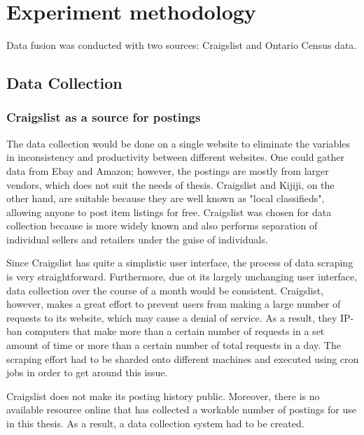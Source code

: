 \documentclass[12pt]{article}
\begin{document}


\section{Experiment methodology}

Data fusion was conducted with two sources: Craigslist and Ontario Census data. 

\subsection{Data Collection}
\subsubsection{Craigslist as a source for postings}
The data collection would be done on a single website to eliminate the variables in inconsistency and productivity between different websites. One could gather data from Ebay and Amazon; however, the postings are mostly from larger vendors, which does not suit the needs of thesis. Craigslist and Kijiji, on the other hand, are suitable because they are well known as "local classifieds", allowing anyone to post item listings for free. Craigslist was chosen for data collection because is more widely known and also performs separation of individual sellers and retailers under the guise of individuals. 

Since Craigslist has quite a simplistic user interface, the process of data scraping is very straightforward. Furthermore, due ot its largely unchanging user interface, data collection over the course of a month would be consistent. Craigslist, however, makes a great effort to prevent users from making a large number of requests to its website, which may cause a denial of service. As a result, they IP-ban computers that make more than a certain number of requests in a set amount of time or more than a certain number of total requests in a day. The scraping effort had to be sharded onto different machines and executed using cron jobs in order to get around this issue.

Craigslist does not make its posting history public. Moreover, there is no available resource online that has collected a workable number of postings for use in this thesis. As a result, a data collection system had to be created.
\end{document}

